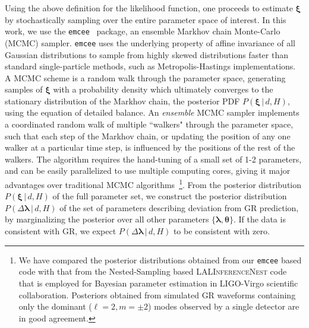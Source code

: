 \documentclass[prl,preprintnumbers,twocolumn,eqsecnum,floatfix,a4paper,nofootinbib,superscriptaddress]{revtex4}
\newcommand{\blambda}{\bm{\lambda}}
\newcommand{\btheta}{\bm{\theta}}
\newcommand{\bxi}{\bm{\xi}}
\begin{document}
Using the above definition for the likelihood function, one proceeds to estimate $\bxi$ by stochastically sampling over the entire parameter space of interest. In this work, we use the \texttt{emcee}~\cite{goodman2010ensemble,foreman2013emcee} package, an ensemble Markhov chain Monte-Carlo (MCMC) sampler. \texttt{emcee} uses the underlying property of affine invariance of all Gaussian distributions to sample from highly skewed distributions faster than standard single-particle methods, such as Metropolis-Hastings implementations. A MCMC scheme is a random walk through the parameter space, generating samples of $\bxi$ with a probability density which ultimately converges to the stationary distribution of the Markhov chain, the posterior PDF $P(\bxi\, |\, d, H)$, using the equation of detailed balance. An \emph{ensemble} MCMC sampler implements a coordinated random walk of multiple ``walkers" through the parameter space, such that each step of the Markhov chain, or updating the position of any one walker at a particular time step, is influenced by the positions of the rest of the walkers. The algorithm requires the hand-tuning of a small set of 1-2 parameters, and can be easily parallelized to use multiple computing cores, giving it major advantages over traditional MCMC algorithms~\footnote{We have compared the posterior distributions obtained from our \texttt{emcee} based code with that from the Nested-Sampling based \textsc{LALInferenceNest} code~\cite{Veitch:2009hd} that is employed for Bayesian parameter estimation in LIGO-Virgo scientific collaboration. Posteriors obtained from simulated GR waveforms containing only the dominant ($\ell = 2, m = \pm 2$) modes observed by a single detector are in good agreement.}. From the posterior distribution $P(\bxi \, | \, d, H)$ of the full parameter set, we construct the posterior distribution $P(\Delta \blambda \, | \, d, H)$ of the set of parameters describing deviation from GR prediction, by marginalizing the posterior over all other parameters $\{\blambda, \btheta\}$. If the data is consistent with GR, we expect $P(\Delta \blambda \, | \, d, H)$ to be consistent with zero. 
\end{document}
